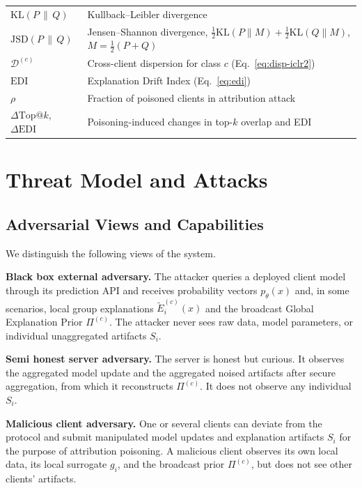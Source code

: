 \documentclass{article}
\theoremstyle{plain}
\theoremstyle{definition}
\theoremstyle{remark}
\begin{document}
\begin{table}[h]
\begin{tabular}{ll}
$\mathrm{KL}(P\,\|\,Q)$ & Kullback--Leibler divergence \\
$\mathrm{JSD}(P\,\|\,Q)$ & Jensen--Shannon divergence, $\tfrac{1}{2}\mathrm{KL}(P\|M)+\tfrac{1}{2}\mathrm{KL}(Q\|M)$, $M=\tfrac{1}{2}(P+Q)$ \\
$\mathcal{D}^{(c)}$ & Cross-client dispersion for class $c$ (Eq.~\ref{eq:disp-iclr2}) \\
$\mathrm{EDI}$ & Explanation Drift Index (Eq.~\ref{eq:edi}) \\
$\rho$ & Fraction of poisoned clients in attribution attack \\
$\Delta\mathrm{Top}@k$, $\Delta\mathrm{EDI}$ & Poisoning-induced changes in top-$k$ overlap and EDI \\
\bottomrule
\end{tabular}
\end{table}


\section{Threat Model and Attacks}
\label{app:threat-model}

\subsection{Adversarial Views and Capabilities}

We distinguish the following views of the system.

\textbf{Black box external adversary.} The attacker queries a deployed client model through its prediction API and receives probability vectors $p_\theta(x)$ and, in some scenarios, local group explanations $\tilde{E}_i^{(c)}(x)$ and the broadcast Global Explanation Prior $\Pi^{(c)}$. The attacker never sees raw data, model parameters, or individual unaggregated artifacts $S_i$.

\textbf{Semi honest server adversary.} The server is honest but curious. It observes the aggregated model update and the aggregated noised artifacts after secure aggregation, from which it reconstructs $\Pi^{(c)}$. It does not observe any individual $S_i$.

\textbf{Malicious client adversary.} One or several clients can deviate from the protocol and submit manipulated model updates and explanation artifacts $S_i$ for the purpose of attribution poisoning. A malicious client observes its own local data, its local surrogate $g_i$, and the broadcast prior $\Pi^{(c)}$, but does not see other clients' artifacts.
\end{document}
